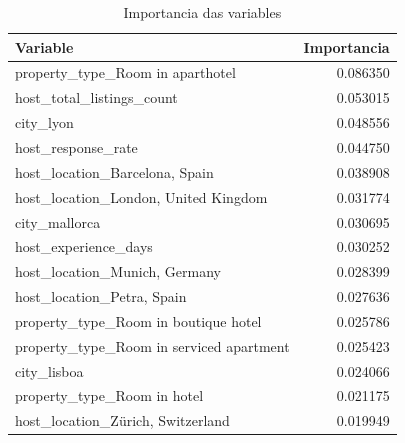 \begin{table}[H]
\caption{Importancia das variables}
\label{tab:importancia_variables}
\begin{tabular}{lr}
\toprule
Variable & Importancia \\
\midrule
property\_type\_Room in aparthotel & 0.086350 \\
host\_total\_listings\_count & 0.053015 \\
city\_lyon & 0.048556 \\
host\_response\_rate & 0.044750 \\
host\_location\_Barcelona, Spain & 0.038908 \\
host\_location\_London, United Kingdom & 0.031774 \\
city\_mallorca & 0.030695 \\
host\_experience\_days & 0.030252 \\
host\_location\_Munich, Germany & 0.028399 \\
host\_location\_Petra, Spain & 0.027636 \\
property\_type\_Room in boutique hotel & 0.025786 \\
property\_type\_Room in serviced apartment & 0.025423 \\
city\_lisboa & 0.024066 \\
property\_type\_Room in hotel & 0.021175 \\
host\_location\_Zürich, Switzerland & 0.019949 \\
\bottomrule
\end{tabular}
\end{table}
